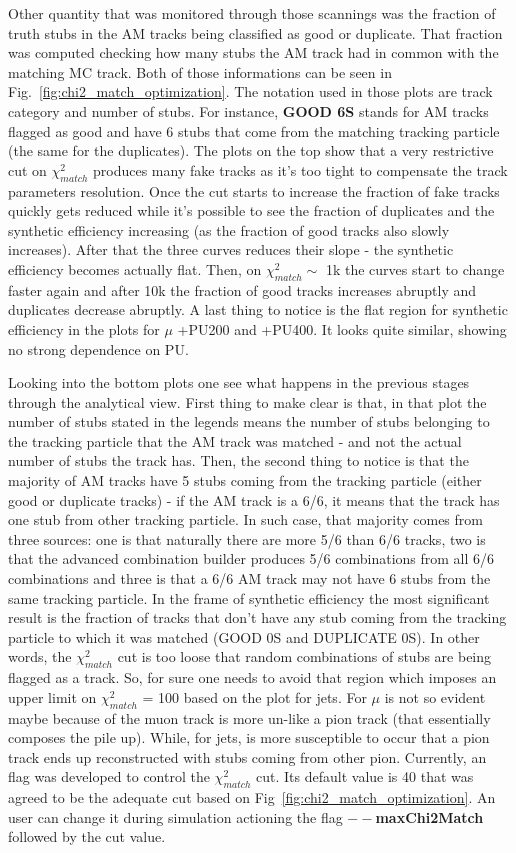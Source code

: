 Other quantity that was monitored through those scannings was the fraction of truth stubs in the AM tracks being classified as good or duplicate. That fraction was computed checking how many stubs the AM track had in common with the matching MC track. Both of those informations can be seen in Fig.~\ref{fig:chi2_match_optimization}. The notation used in those plots are track category and number of stubs. For instance, \textbf{GOOD 6S} stands for AM tracks flagged as good and have 6 stubs that come from the matching tracking particle (the same for the duplicates). The plots on the top show that a very restrictive cut on $\chi^{2}_{match}$ produces many fake tracks as it's too tight to compensate the track parameters resolution. Once the cut starts to increase the fraction of fake tracks quickly gets reduced while it's possible to see the fraction of duplicates and the synthetic efficiency increasing (as the fraction of good tracks also slowly increases). After that the three curves reduces their slope - the synthetic efficiency becomes actually flat. Then, on $\chi^{2}_{match} \sim$ 1k the curves start to change faster again and after 10k the fraction of good tracks increases abruptly and duplicates decrease abruptly. A last thing to notice is the flat region for synthetic efficiency in the plots for $\mu$ +PU200 and +PU400. It looks quite similar, showing no strong dependence on PU.

Looking into the bottom plots one see what happens in the previous stages through the analytical view. First thing to make clear is that, in that plot the number of stubs stated in the legends means the number of stubs belonging to the tracking particle that the AM track was matched - and not the actual number of stubs the track has. Then, the second thing to notice is that the majority of AM tracks have 5 stubs coming from the tracking particle (either good or duplicate tracks) - if the AM track is a 6/6, it means that the track has one stub from other tracking particle. In such case, that majority comes from three sources: one is that naturally there are more 5/6 than 6/6 tracks, two is that the advanced combination builder produces 5/6 combinations from all 6/6 combinations and three is that a 6/6 AM track may not have 6 stubs from the same tracking particle. In the frame of synthetic efficiency the most significant result is the fraction of tracks that don't have any stub coming from the tracking particle to which it was matched (GOOD 0S and DUPLICATE 0S). In other words, the $\chi^{2}_{match}$ cut is too loose that random combinations of stubs are being flagged as a track. So, for sure one needs to avoid that region which imposes an upper limit on $\chi^{2}_{match}$ = 100 based on the plot for jets. For $\mu$ is not so evident maybe because of the muon track is more un-like a pion track (that essentially composes the pile up). While, for jets, is more susceptible to occur that a pion track ends up reconstructed with stubs coming from other pion. Currently, an flag was developed to control the $\chi^{2}_{match}$ cut. Its default value is 40 that was agreed to be the adequate cut based on Fig~\ref{fig:chi2_match_optimization}. An user can change it during simulation actioning the flag \textbf{$--$maxChi2Match} followed by the cut value.

